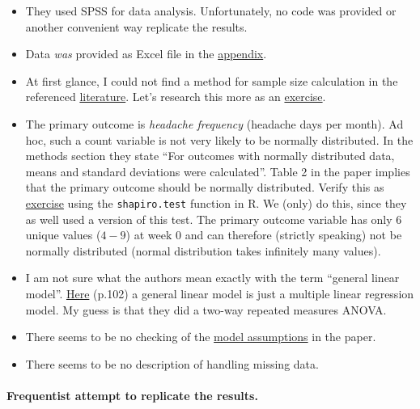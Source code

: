 \documentclass[
]{article}
\begin{document}
\begin{itemize}
\item
  They used SPSS for data analysis. Unfortunately, no code was provided
  or another convenient way replicate the results.
\item
  Data \emph{was} provided as Excel file in the
  \href{https://www.sciencedirect.com/science/article/pii/S1836955324000572?via\%3Dihub\#appsec1}{appendix}.
\item
  At first glance, I could not find a method for sample size calculation
  in the referenced
  \href{https://journals.sagepub.com/doi/epub/10.1177/0333102417738202}{literature}.
  Let's research this more as an \hyperref[exercise8_LMM]{exercise}.
\item
  The primary outcome is \emph{headache frequency} (headache days per
  month). Ad hoc, such a count variable is not very likely to be
  normally distributed. In the methods section they state ``For outcomes
  with normally distributed data, means and standard deviations were
  calculated''. Table 2 in the paper implies that the primary outcome
  should be normally distributed. Verify this as
  \hyperref[exercise9_LMM]{exercise} using the \texttt{shapiro.test}
  function in R. We (only) do this, since they as well used a version of
  this test. The primary outcome variable has only \(6\) unique values
  (\(4-9\)) at week \(0\) and can therefore (strictly speaking) not be
  normally distributed (normal distribution takes infinitely many
  values).
\item
  I am not sure what the authors mean exactly with the term ``general
  linear model''.
  \href{https://books.google.at/books?hl=en&lr=&id=G_qdEsDlkp0C&oi=fnd&pg=PA101&dq=\%22general+linear+model\%22&ots=Xo0OAwX2UL&sig=TRvLmI4G9oti296S5wjmiWjfWVY&redir_esc=y\#v=onepage&q=\%22general\%20linear\%20model\%22&f=false}{Here}
  (p.102) a general linear model is just a multiple linear regression
  model. My guess is that they did a two-way repeated measures ANOVA.
\item
  There seems to be no checking of the
  \href{https://statistics.laerd.com/spss-tutorials/two-way-repeated-measures-anova-using-spss-statistics.php}{model
  assumptions} in the paper.
\item
  There seems to be no description of handling missing data.
\end{itemize}

\paragraph{Frequentist attempt to replicate the
results.}\label{frequentist-attempt-to-replicate-the-results.}
\end{document}
